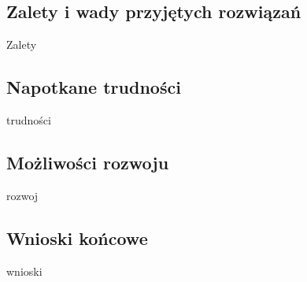 \documentclass[12pt]{article}
\begin{document}
\begin{sloppypar}
{  \subsection{Zalety i wady przyjętych rozwiązań}
  {
    Zalety
  }
  \subsection{Napotkane trudności}
  {
    trudności
  }
  \subsection{Możliwości rozwoju}
  {
    rozwoj
  }
  \subsection{Wnioski końcowe}
  {
    wnioski
  }
}

\clearpage
\printbibliography[
  heading=bibintoc,
  title={Bibliografia}
]

\clearpage
\listoffigures

\clearpage
\listoftables

\clearpage
{}
\lstlistoflistings

\end{sloppypar}
\end{document}
